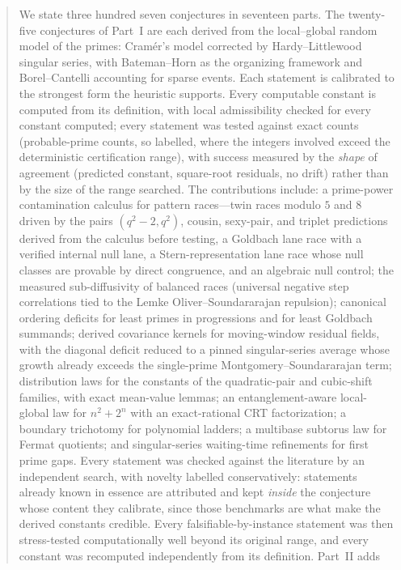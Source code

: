 \documentclass[11pt]{article}
\theoremstyle{definition}
\begin{document}
\begin{abstract}
We state three hundred seven conjectures in seventeen parts.  The twenty-five conjectures of Part~I are each derived from the
local--global random model of the primes:
Cram\'er's model corrected by Hardy--Littlewood singular series, with
Bateman--Horn as the organizing framework and Borel--Cantelli accounting
for sparse events.  Each statement is calibrated to the strongest form the
heuristic supports.  Every computable constant is
computed from its definition, with local admissibility checked for
every constant computed; every statement was tested against exact
counts (probable-prime counts, so labelled, where the integers
involved exceed the deterministic certification range), with
success measured by the \emph{shape} of agreement (predicted constant,
square-root residuals, no drift) rather than by the size of the range
searched.  The contributions include: a prime-power contamination
calculus for pattern races---twin races modulo $5$ and $8$ driven by the
pairs $(q^2-2,q^2)$, cousin, sexy-pair, and triplet predictions derived
from the calculus before testing, a Goldbach lane race with a verified
internal null lane, a Stern-representation lane race whose null classes
are provable by direct congruence, and an algebraic null control; the
measured sub-diffusivity of balanced races (universal negative step
correlations tied to the Lemke Oliver--Soundararajan repulsion);
canonical ordering deficits for least primes in progressions and for
least Goldbach summands; derived covariance kernels for moving-window
residual fields, with the diagonal deficit reduced to a pinned
singular-series average whose growth already exceeds the single-prime
Montgomery--Soundararajan term; distribution laws for the constants of
the quadratic-pair and cubic-shift families, with exact mean-value
lemmas; an entanglement-aware local-global law for $n^2+2^n$ with an
exact-rational CRT factorization; a boundary trichotomy for polynomial
ladders; a multibase subtorus law for Fermat quotients; and
singular-series waiting-time refinements for first prime gaps.  Every
statement was checked against the literature by an independent search,
with novelty labelled conservatively: statements already known in
essence are attributed and kept \emph{inside} the conjecture whose
content they calibrate, since those benchmarks are what make the derived
constants credible.  Every falsifiable-by-instance statement was then
stress-tested computationally well beyond its original range, and every
constant was recomputed independently from its definition.  Part~II adds

\end{abstract}
\end{document}
